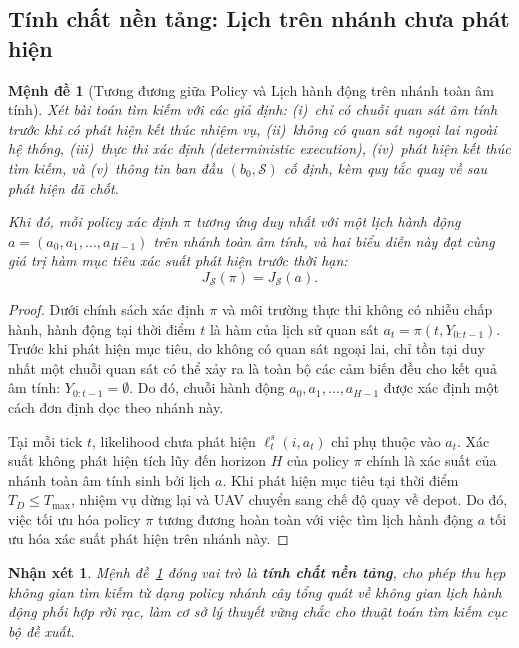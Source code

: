 \documentclass[12pt,a4paper]{article}
\newtheorem{proposition}{Mệnh đề}
\newtheorem{remark}{Nhận xét}
\begin{document}
\subsection{Tính chất nền tảng: Lịch trên nhánh chưa phát hiện}

\begin{proposition}[Tương đương giữa Policy và Lịch hành động trên nhánh toàn âm tính]
\label{prop:equiv}
Xét bài toán tìm kiếm với các giả định: (i)~chỉ có chuỗi quan sát âm tính trước khi có phát hiện kết thúc nhiệm vụ, (ii)~không có quan sát ngoại lai ngoài hệ thống, (iii)~thực thi xác định (deterministic execution), (iv)~phát hiện kết thúc tìm kiếm, và (v)~thông tin ban đầu $(b_0, \mathcal{S})$ cố định, kèm quy tắc quay về sau phát hiện đã chốt.

Khi đó, mỗi policy xác định $\pi$ tương ứng duy nhất với một lịch hành động $a = (a_0, a_1, \ldots, a_{H-1})$ trên nhánh toàn âm tính, và hai biểu diễn này đạt cùng giá trị hàm mục tiêu xác suất phát hiện trước thời hạn:
\begin{equation}
J_{\mathcal{S}}(\pi) = J_{\mathcal{S}}(a).
\end{equation}
\end{proposition}

\begin{proof}
Dưới chính sách xác định $\pi$ và môi trường thực thi không có nhiễu chấp hành, hành động tại thời điểm $t$ là hàm của lịch sử quan sát $a_t = \pi(t, Y_{0:t-1})$. Trước khi phát hiện mục tiêu, do không có quan sát ngoại lai, chỉ tồn tại duy nhất một chuỗi quan sát có thể xảy ra là toàn bộ các cảm biến đều cho kết quả âm tính: $Y_{0:t-1} = \emptyset$. Do đó, chuỗi hành động $a_0, a_1, \ldots, a_{H-1}$ được xác định một cách đơn định dọc theo nhánh này. 

Tại mỗi tick $t$, likelihood chưa phát hiện $\ell_t^s(i, a_t)$ chỉ phụ thuộc vào $a_t$. Xác suất không phát hiện tích lũy đến horizon $H$ của policy $\pi$ chính là xác suất của nhánh toàn âm tính sinh bởi lịch $a$. Khi phát hiện mục tiêu tại thời điểm $T_D \le T_{\max}$, nhiệm vụ dừng lại và UAV chuyển sang chế độ quay về depot. Do đó, việc tối ưu hóa policy $\pi$ tương đương hoàn toàn với việc tìm lịch hành động $a$ tối ưu hóa xác suất phát hiện trên nhánh này.
\end{proof}

\begin{remark}
Mệnh đề~\ref{prop:equiv} đóng vai trò là \textbf{tính chất nền tảng}, cho phép thu hẹp không gian tìm kiếm từ dạng policy nhánh cây tổng quát về không gian lịch hành động phối hợp rời rạc, làm cơ sở lý thuyết vững chắc cho thuật toán tìm kiếm cục bộ đề xuất.
\end{remark}
\end{document}

